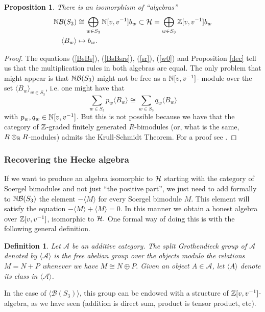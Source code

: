 \documentclass[12pt]{wart}
\newtheorem{defi}{Definition}
\newtheorem{prop}[thm]{Proposition}
\theoremstyle{remark}
\def\cA{\mathcal A}\def\cB{\mathcal B}\def\cC{\mathcal C}\def\cD{\mathcal D}
\begin{document}
\begin{prop}\label{iso}
There is an isomorphism of ``algebras''
\begin{align*}\NN\cB(S_3)&\cong \bigoplus_{w\in S_3}\NN[v,v^{-1}]b_w\subset \cH =\bigoplus_{w\in S_3}\ZZ[v,v^{-1}]b_w\\ 
\langle B_w\rangle &\mapsto b_w.
\end{align*}
\end{prop}
\begin{proof}

The  equations (\ref{BsBs}), (\ref{BsBsrs}),  (\ref{sr}),  (\ref{w0}) and  Proposition \ref{dec} tell us that the multiplication rules in both algebras are equal. 
The only problem that might appear is that $\NN\cB(S_3)$ might not be free as a $\mathbb N[v,v^{-1}]$- module over the set $\langle B_w\rangle_{w\in S_3}$, i.e. one might have that $$\sum_{w\in S_3}p_w \langle B_w\rangle\cong \sum_{w\in S_3}q_w \langle B_w\rangle $$ with $p_w, q_w\in \mathbb N[v,v^{-1}]$. But this is not possible because we have that the category of $\mathbb Z$-graded finitely generated $R$-bimodules  (or, what is the same, $R\otimes_{\mathbb R}R$-modules) admits the Krull-Schmidt Theorem. For a proof see \cite[Section 5.4]{Pi}.
\end{proof}

\subsubsection{Recovering the Hecke algebra}

If we want to produce  an algebra isomorphic to $\mathcal H$ starting with the category of Soergel bimodules and not just ``the positive part'', we just need to add formally to $\NN\cB(S_3)$ the element $-\langle M\rangle$ for every  Soergel bimodule $M$.  This element will satisfy the equation $-\langle M\rangle+\langle M\rangle=0.$ In this manner we obtain a honest algebra over $ \mathbb Z[v,v^{-1}]$, isomorphic to $\mathcal H.$
 One formal way of doing this is  with the following general definition. 
\begin{defi} Let $\cA$ be an additive category. The \emph{split Grothendieck group} of $\cA$ denoted by $\langle \cA\rangle$ is the free abelian group over the objects modulo the relations $M=N+P$ whenever we have $M\cong N\oplus P.$ Given an object $A\in \cA$, let $\langle A\rangle$ denote its class in $\langle \cA\rangle$.
\end{defi}

In the case of $\langle \cB(S_3)\rangle$, this group can be endowed with a structure of $ \mathbb Z[v,v^{-1}]$-algebra, as we have seen (addition is direct sum, product is tensor product, etc). 
\end{document}
